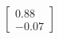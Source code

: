 \documentclass[preview]{standalone}
\begin{document}
\begin{align*}
\begin{bmatrix} 0.88 \\ -0.07 \end{bmatrix}
\end{align*}
\end{document}
